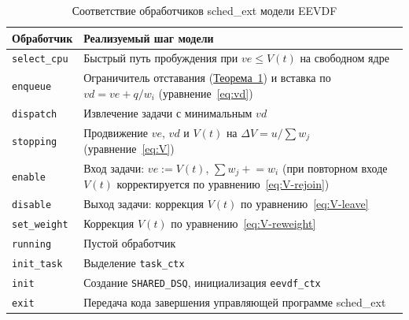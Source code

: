 \documentclass[14pt, oneside]{extbook}
\begin{document}
        \begin{table}[h]
                \centering
                \caption{Соответствие обработчиков sched\_ext модели EEVDF}
                \label{tab:eevdf_ops}
                \vspace{0.4em}
                \begin{tabular}{|l|P{9cm}|}
                        \hline
                        \textbf{Обработчик} & \textbf{Реализуемый шаг модели} \\
                        \hline
                        \texttt{select\_cpu} & Быстрый путь
                                пробуждения при $ve \leq V(t)$ на
                                свободном ядре \\
                        \hline
                        \texttt{enqueue} & Ограничитель отставания
                                (\hyperlink{thm:lag-bound}{Теорема~1})
                                и вставка по $vd = ve + q/w_i$
                                (уравнение~\eqref{eq:vd}) \\
                        \hline
                        \texttt{dispatch} & Извлечение задачи с
                                минимальным $vd$ \\
                        \hline
                        \texttt{stopping} & Продвижение $ve$, $vd$
                                и $V(t)$ на $\Delta V = u / {\textstyle\sum} w_j$
                                (уравнение~\eqref{eq:V}) \\
                        \hline
                        \texttt{enable} & Вход задачи: $ve := V(t)$,
                                ${\textstyle\sum} w_j \mathrel{+}= w_i$ (при
                                повторном входе $V(t)$ корректируется
                                по уравнению~\eqref{eq:V-rejoin}) \\
                        \hline
                        \texttt{disable} & Выход задачи: коррекция
                                $V(t)$ по уравнению~\eqref{eq:V-leave} \\
                        \hline
                        \texttt{set\_weight} & Коррекция $V(t)$ по
                                уравнению~\eqref{eq:V-reweight} \\
                        \hline
                        \texttt{running} & Пустой обработчик \\
                        \hline
                        \texttt{init\_task} & Выделение
                                \texttt{task\_ctx} \\
                        \hline
                        \texttt{init} & Создание \texttt{SHARED\_DSQ},
                                инициализация \texttt{eevdf\_ctx} \\
                        \hline
                        \texttt{exit} & Передача кода завершения
                                управляющей программе sched\_ext \\
                        \hline
                \end{tabular}
        \end{table}
\end{document}
